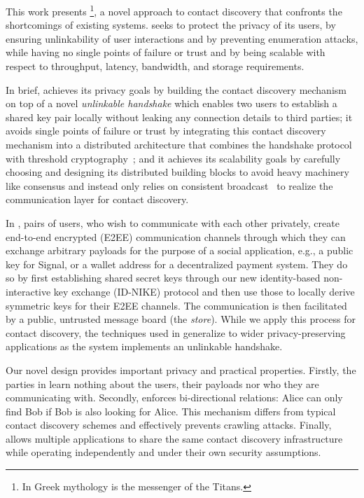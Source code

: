 This work presents \sysname\footnote{In Greek mythology \sys is the messenger
of the Titans.}, a novel approach to contact discovery that confronts the
shortcomings of existing systems. 
\sysname seeks to protect the privacy of its users, by ensuring unlinkability
of user interactions and by preventing enumeration attacks, while having no
single points of failure or trust and by being scalable with respect to
throughput, latency, bandwidth, and storage requirements. 

In brief, \sysname achieves its privacy goals by building the contact discovery
mechanism on top of a novel {\em unlinkable handshake} which enables two users
to establish a shared key pair locally without leaking any connection details to
third parties; 
it avoids single points of failure or trust by integrating this contact
discovery mechanism into a distributed architecture that combines the handshake
protocol with threshold cryptography~\cite{desantis1994how};
and it achieves its scalability goals by carefully choosing and designing its
distributed building blocks to avoid heavy machinery like consensus and instead
only relies on consistent broadcast~\cite{cachin2011introduction} to realize
the communication layer for contact discovery.

In \sys, pairs of users, who wish to communicate with each other privately,
create end-to-end encrypted (E2EE) communication channels through which they
can exchange arbitrary payloads for the purpose of a social application, e.g.,
a public key for Signal, or a wallet address for a decentralized payment system.
They do so by first establishing shared secret keys through our new
identity-based non-interactive key exchange (ID-NIKE) protocol and then use
those to locally derive symmetric keys for their \sys E2EE channels. 
The communication is then facilitated by a public, untrusted message board (the
{\em store}). 
While we apply this process for contact discovery, the techniques used in \sys
generalize to wider privacy-preserving applications as the system implements an
unlinkable handshake. 

Our novel design provides important privacy and practical properties. 
Firstly, the parties in \sys learn nothing about the users, their payloads
nor who they are communicating with. 
Secondly, \sys enforces bi-directional relations: Alice can only find Bob if
Bob is also looking for Alice. 
This mechanism differs from typical contact discovery schemes and effectively
prevents crawling attacks. 
Finally, \sys allows multiple applications to share the same contact discovery
infrastructure while operating independently and under their own security
assumptions.

